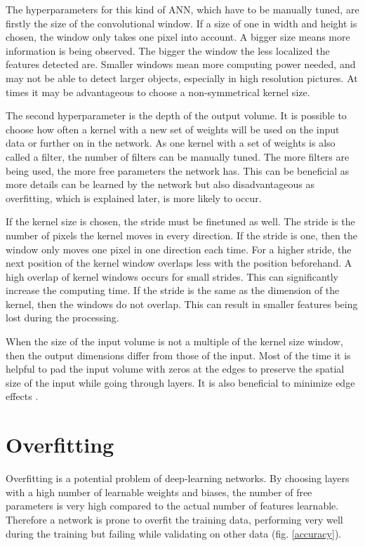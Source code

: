 The hyperparameters for this kind of ANN, which have to be manually tuned, are firstly the size of the convolutional window. If a size of one in width and height is chosen, the window only takes one pixel into account. A bigger size means more information is being observed. The bigger the window the less localized the features detected are. Smaller windows mean more computing power needed, and may not be able to detect larger objects, especially in high resolution pictures. At times it may be advantageous to choose a non-symmetrical kernel size.

The second hyperparameter is the depth of the output volume. It is possible to choose how often a kernel with a new set of weights will be used on the input data or further on in the network. As one kernel with a set of weights is also called a filter, the number of filters can be manually tuned. The more filters are being used, the more free parameters the network has. This can be beneficial as more details can be learned by the network but also disadvantageous as overfitting, which is explained later, is more likely to occur.

If the kernel size is chosen, the stride must be finetuned as well. The stride is the number of pixels the kernel moves in every direction. If the stride is one, then the window only moves one pixel in one direction each time. For a higher stride, the next position of the kernel window overlaps less with the position beforehand. A high overlap of kernel windows occurs for small strides. This can significantly increase the computing time. If the stride is the same as the dimension of the kernel, then the windows do not overlap. This can result in smaller features being lost during the processing.

When the size of the input volume is not a multiple of the kernel size window, then the output dimensions differ from those of the input. Most of the time it is helpful to pad the input volume with zeros at the edges to preserve the spatial size of the input while going through layers. It is also beneficial to minimize edge effects \cite{lecun-89e}.

\section{Overfitting}
Overfitting is a potential problem of deep-learning networks. By choosing layers with a high number of learnable weights and biases, the number of free parameters is very high compared to the actual number of features learnable. Therefore a network is prone to overfit the training data, performing very well during the training but failing while validating on other data (fig. \ref{accuracy}). 

